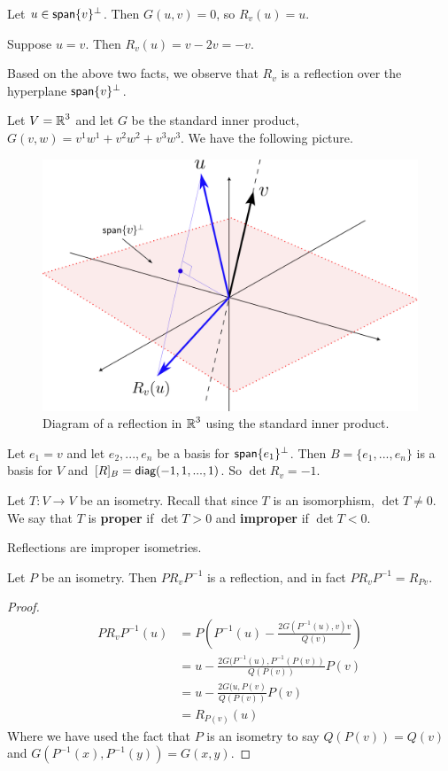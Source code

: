 \begin{remark*}
    Let $u \in \operatorname{\textsf{span}}\{v\}^\perp$. Then $G(u,v)=0$, so $R_v(u)=u$.
\end{remark*}
\begin{remark*}
    Suppose $u=v$. Then $R_v(u) = v-2v = -v$.
\end{remark*}
\begin{remark*}
    Based on the above two facts, we observe that $R_v$ is a reflection over the hyperplane $\operatorname{\textsf{span}}\{v\}^\perp$.
\end{remark*}
\begin{example}
    Let $V = \operatorname{\mathbb{R}}^3$ and let $G$ be the standard inner product, $G(v,w) = v^1 w^1 + v^2 w^2 + v^3 w^3$. We have the following picture. 
\end{example}
\begin{figure}[h!]
    \centering
    \includegraphics[width=0.6\linewidth]{reflection.png}
    \caption{Diagram of a reflection in $\operatorname{\mathbb{R}}^3$ using the standard inner product.}
    \label{fig:reflectionr3}
\end{figure}
\begin{remark*}
    Let $e_1=v$ and let $e_2,...,e_n$ be a basis for $\operatorname{\textsf{span}}\{e_1\}^\perp$. Then $B = \{e_1,...,e_n\}$ is a basis for $V$ and $[R]_B = \operatorname{\textsf{diag}}(-1,1,...,1)$. So $\det R_v = -1$. 
\end{remark*}
\begin{defn}
    Let $T : V \to V$ be an isometry. Recall that since $T$ is an isomorphism, $\det T \neq 0$. We say that $T$ is \textbf{proper} if $\det T >0$ and \textbf{improper} if $\det T<0$. 
\end{defn}
\begin{remark*}
    Reflections are improper isometries.
\end{remark*}
\begin{lemma}
    Let $P$ be an isometry. Then $P R_v P^{-1}$ is a reflection, and in fact $P R_v P^{-1} = R_{Pv}$.
\end{lemma}
\begin{proof}
    \begin{align*}
        P R_v P^{-1}(u) &= P(P^{-1}(u) - \frac{2G(P^{-1}(u),v)v}{Q(v)})\\
        &= u-\frac{2 G(P^{-1}(u),P^{-1}(P(v))}{Q(P(v))}P(v)\\
        &= u-\frac{2 G(u,P(v)}{Q(P(v))}P(v)\\
        &= R_{P(v)}(u)
    \end{align*}
    Where we have used the fact that $P$ is an isometry to say $Q(P(v))=Q(v)$ and $G(P^{-1}(x),P^{-1}(y))=G(x,y)$.
\end{proof}
